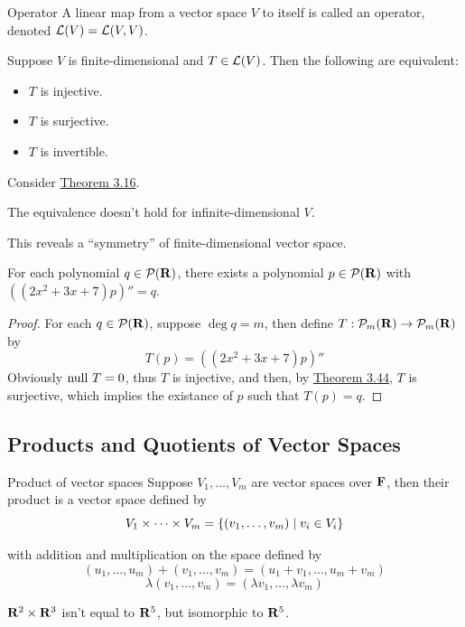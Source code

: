 \documentclass[12pt,a4paper]{article}
\begin{document}
    \begin{defi}{Operator}
        A linear map from a vector space $V$ to itself is called an operator, denoted $\mathcal{L}(V)=\mathcal{L}(V,V)$.
    \end{defi}
    \hfill

    \begin{thm}\label{3.44}
        Suppose $V$ is finite-dimensional and $T\in\mathcal{L}(V)$. Then the following are equivalent:
        \begin{itemize}
            \item $T$ is injective.
            \item $T$ is surjective.
            \item $T$ is invertible.
        \end{itemize}
    \end{thm}
    \begin{remark}
        Consider \hyperref[3.16]{Theorem 3.16}.
    \end{remark}
    \begin{remark}
        The equivalence doesn't hold for infinite-dimensional $V$.
    \end{remark}
    \begin{remark}
        This reveals a “symmetry” of finite-dimensional vector space.
    \end{remark}
    \hfill
    
    \begin{eg}
        For each polynomial $q\in\mathcal{P}(\mathbf{R})$, there exists a polynomial $p\in\mathcal{P}(\mathbf{R})$ with $((2x^2+3x+7)p)''=q$.
    \end{eg}
    \begin{proof}
        For each $q\in\mathcal{P}(\mathbf{R})$, suppose $\deg q=m$, then define $T:\mathcal{P}_m(\mathbf{R})\to\mathcal{P}_m(\mathbf{R})$ by 
        $$T(p)=((2x^2+3x+7)p)''$$
        Obviously $\operatorname{null\,} T=0$, thus $T$ is injective, and then, by \hyperref[3.44]{Theorem 3.44}, $T$ is surjective, which implies the existance of $p$ such that $T(p)=q$.
    \end{proof}
    \hfill

    \subsection{Products and Quotients of Vector Spaces}
    \begin{defi}{Product of vector spaces}
        Suppose $V_1,\dots,V_m$ are vector spaces over $\mathbf{F}$, then their product is a vector space defined by
        $$
        V_1\times\cdots\times V_m=\left\{(v_1,\dots,v_m)\mid v_i\in V_i\right\}
        $$
        
        with addition and multiplication on the space defined by
        $$
        (u_1,\dots,u_m)+(v_1,\dots,v_m)=(u_1+v_1,\dots,u_m+v_m)
        $$$$
        \lambda(v_1,\dots,v_m)=(\lambda v_1,\dots,\lambda v_m)
        $$
    \end{defi}
    \begin{eg}
        $\mathbf{R}^2\times\mathbf{R}^3$ isn't equal to $\mathbf{R}^5$, but isomorphic to $\mathbf{R}^5$.
    \end{eg}
    \hfill
\end{document}
